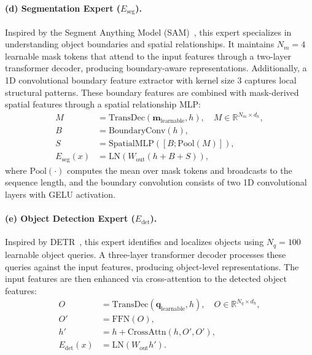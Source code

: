 \paragraph{(d) Segmentation Expert ($E_{\text{seg}}$).}
Inspired by the Segment Anything Model (SAM)~\cite{kirillov2023segment}, this expert specializes in understanding object boundaries and spatial relationships. It maintains $N_m = 4$ learnable mask tokens that attend to the input features through a two-layer transformer decoder, producing boundary-aware representations. Additionally, a 1D convolutional boundary feature extractor with kernel size 3 captures local structural patterns. These boundary features are combined with mask-derived spatial features through a spatial relationship MLP:
\begin{align}
    M &= \text{TransDec}(\mathbf{m}_{\text{learnable}}, h), \quad M \in \mathbb{R}^{N_m \times d_h}, \\
    B &= \text{BoundaryConv}(h), \\
    S &= \text{SpatialMLP}\!\left([B; \text{Pool}(M)]\right), \\
    E_{\text{seg}}(x) &= \text{LN}\!\left(W_{\text{out}}\!\left(h + B + S\right)\right),
\end{align}
where $\text{Pool}(\cdot)$ computes the mean over mask tokens and broadcasts to the sequence length, and the boundary convolution consists of two 1D convolutional layers with GELU activation.

\paragraph{(e) Object Detection Expert ($E_{\text{det}}$).}
Inspired by DETR~\cite{carion2020end}, this expert identifies and localizes objects using $N_q = 100$ learnable object queries. A three-layer transformer decoder processes these queries against the input features, producing object-level representations. The input features are then enhanced via cross-attention to the detected object features:
\begin{align}
    O &= \text{TransDec}(\mathbf{q}_{\text{learnable}}, h), \quad O \in \mathbb{R}^{N_q \times d_h}, \\
    O' &= \text{FFN}(O), \\
    h' &= h + \text{CrossAttn}(h, O', O'), \\
    E_{\text{det}}(x) &= \text{LN}\!\left(W_{\text{out}} h'\right).
\end{align}

